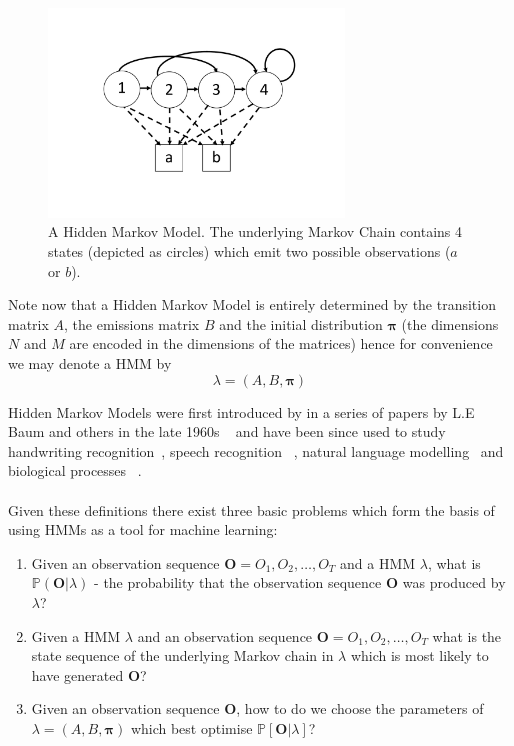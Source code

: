 \begin{figure}[]
  \centering
    \includegraphics[width=0.7\textwidth]{ThesisFigs/HMMExample}
  \caption{A Hidden Markov Model. The underlying Markov Chain contains 4 states (depicted as circles) which emit two possible observations ($a$ or $b$).}\label{fig:hmmex}
\end{figure}


Note now that a Hidden Markov Model is entirely determined by the transition matrix $A$, the emissions matrix $B$ and the initial distribution $\bm{\pi}$ (the dimensions $N$ and $M$ are encoded in the dimensions of the matrices) hence for convenience we may denote a HMM by
\begin{equation*}
\lambda = (A,B, \bm{\pi})
\end{equation*}

Hidden Markov Models were first introduced by in a series of papers by L.E Baum and others in the late 1960s ~\citep{baum1966statistical,baum1970maximization} and have been since used to study handwriting recognition~\citep{bunke1995off}, speech recognition ~\citep{juang1991hidden, jelinek1998statistical}, natural language modelling~\citep{manning1999foundations, jurafsky2002speech} and biological processes ~\citep{krogh1994hidden, durbin1998biological, lio1998models}.
\\
\\
Given these definitions there exist three basic problems which form the basis of using HMMs as a tool for machine learning:
\begin{enumerate}
\item Given an observation sequence $\bm{O} = O_1,O_2,\dots,O_T$ and a HMM $\lambda$, what is $\mathbb{P}(\bm{O}|\lambda)$ - the probability that the observation sequence $\bm{O}$ was produced by $\lambda$?
\item Given a HMM $\lambda$ and an observation sequence $\bm{O} = O_1,O_2,\dots,O_T $ what is the state sequence of the underlying Markov chain in $\lambda$ which is most likely to have generated $\bm{O}$?
\item Given an observation sequence $\bm{O}$, how to do we choose the parameters of $\lambda = (A,B,\bm{\pi})$ which best optimise $\mathbb{P}[\bm{O}|\lambda]$?
\end{enumerate}

